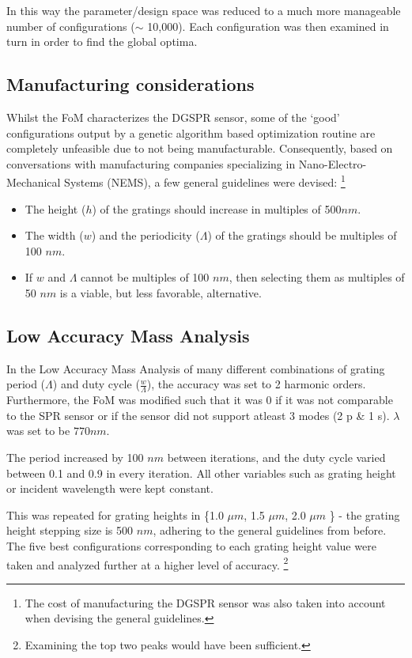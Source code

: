 In this way the parameter/design space was reduced to a much more manageable number of configurations ($\sim$ 10,000). Each configuration was then examined in turn in order to find the global optima.  


\subsection{Manufacturing considerations}

Whilst the FoM characterizes the DGSPR sensor, some of the `good' configurations output by a genetic algorithm based optimization routine are completely unfeasible due to not being manufacturable. Consequently, based on conversations with manufacturing companies specializing in Nano-Electro-Mechanical Systems (NEMS), a few general guidelines were devised: \footnote{The cost of manufacturing the DGSPR sensor was also taken into account when devising the general guidelines.}

\begin{itemize}
\item The height ($h$) of the gratings should increase in multiples of 500$nm$.

\item The width ($w$) and the periodicity ($\Lambda$) of the gratings should be multiples of 100 $nm$. 

\item If $w$ and $\Lambda$ cannot be multiples of 100 $nm$, then selecting them as multiples of 50 $nm$ is a viable, but less favorable, alternative. 
\end{itemize}

\subsection{Low Accuracy Mass Analysis}

In the Low Accuracy Mass Analysis of many different combinations of grating period ($\Lambda$) and duty cycle ($\frac{w}{\Lambda}$), the accuracy was set to 2 harmonic orders. Furthermore, the FoM was modified such that it was 0 if it was not comparable to the SPR sensor or if the sensor did not support atleast 3 modes (2 p \& 1 s). $\lambda$ was set to be $770 nm$.

The period increased by 100 $nm$ between iterations, and the duty cycle varied between 0.1 and 0.9 in every iteration. All other variables such as grating height or incident wavelength were kept constant. 

This was repeated for grating heights in \{1.0 $\mu m$, 1.5 $\mu m$, 2.0 $\mu m$ \} - the grating height stepping size is 500 $nm$, adhering to the general guidelines from before. The five best configurations corresponding to each grating height value were taken and analyzed further at a higher level of accuracy. \footnote{Examining the top two peaks would have been sufficient.}

